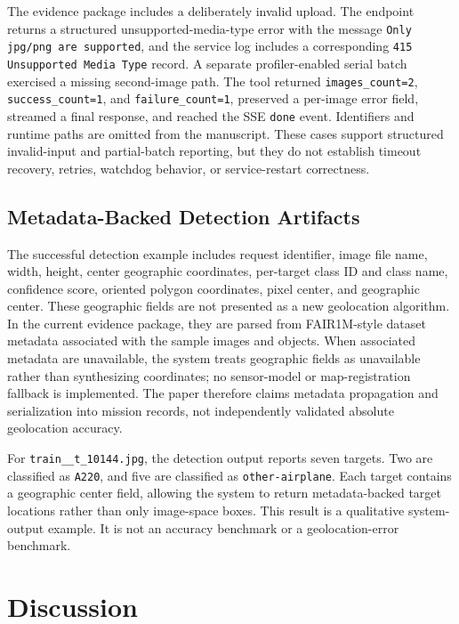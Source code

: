 \documentclass[10pt,letterpaper]{article}
\begin{document}
The evidence package includes a deliberately invalid upload. The endpoint returns a structured unsupported-media-type error with the message \texttt{Only jpg/png are supported}, and the service log includes a corresponding \texttt{415 Unsupported Media Type} record. A separate profiler-enabled serial batch exercised a missing second-image path. The tool returned \texttt{images\_count=2}, \texttt{success\_count=1}, and \texttt{failure\_count=1}, preserved a per-image error field, streamed a final response, and reached the SSE \texttt{done} event. Identifiers and runtime paths are omitted from the manuscript. These cases support structured invalid-input and partial-batch reporting, but they do not establish timeout recovery, retries, watchdog behavior, or service-restart correctness.

\subsection{Metadata-Backed Detection Artifacts}

The successful detection example includes request identifier, image file name, width, height, center geographic coordinates, per-target class ID and class name, confidence score, oriented polygon coordinates, pixel center, and geographic center. These geographic fields are not presented as a new geolocation algorithm. In the current evidence package, they are parsed from FAIR1M-style dataset metadata associated with the sample images and objects. When associated metadata are unavailable, the system treats geographic fields as unavailable rather than synthesizing coordinates; no sensor-model or map-registration fallback is implemented. The paper therefore claims metadata propagation and serialization into mission records, not independently validated absolute geolocation accuracy.

For \texttt{train\_\_t\_10144.jpg}, the detection output reports seven targets. Two are classified as \texttt{A220}, and five are classified as \texttt{other-airplane}. Each target contains a geographic center field, allowing the system to return metadata-backed target locations rather than only image-space boxes. This result is a qualitative system-output example. It is not an accuracy benchmark or a geolocation-error benchmark.



\section{Discussion}
\end{document}
